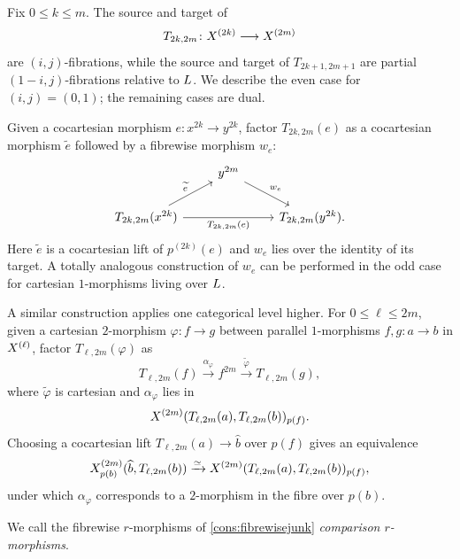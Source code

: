 \documentclass[a4paper,reqno,twoside]{amsart}
\begin{document}
\begin{construction}\label{cons:fibrewisejunk}
	Fix $0\leq k\leq m$. The source and target of
	\[
		T_{2k,2m}\colon\relax{X}^{(2k)}\longrightarrow\relax{X}^{(2m)}
	\]
	are $(i,j)$-fibrations, while the source and target of $T_{2k+1,2m+1}$ are partial $(1-i,j)$-fibrations relative to $\relax{L}$. We describe the even case for $(i,j)=(0,1)$; the remaining cases are dual.

	Given a cocartesian morphism $e\colon x^{2k}\to y^{2k}$, factor $T_{2k,2m}(e)$ as a cocartesian morphism $\widetilde e$ followed by a fibrewise morphism $w_e$:
	\[
	\begin{tikzcd}
		& y^{2m} \arrow[dr,"w_e"] & \\
		T_{2k,2m}(x^{2k}) \arrow[ur,"\widetilde e"]
			\arrow[rr,"T_{2k,2m}(e)"']
		&& T_{2k,2m}(y^{2k}).
	\end{tikzcd}
	\]
	Here $\widetilde e$ is a cocartesian lift of $p^{(2k)}(e)$ and $w_e$ lies over the identity of its target. A totally analogous construction of $w_e$ can be performed in the odd case for cartesian $1$-morphisms living over $\relax{L}$.

	A similar construction applies one categorical level higher. For $0\leq\ell\leq2m$, given a cartesian $2$-morphism $\varphi\colon f\to g$ between parallel $1$-morphisms $f,g\colon a\to b$ in $\relax{X}^{(\ell)}$, factor $T_{\ell,2m}(\varphi)$ as
	\[
		T_{\ell,2m}(f)
		\xrightarrow{\alpha_\varphi} f^{2m}
		\xrightarrow{\widetilde\varphi} T_{\ell,2m}(g),
	\]
	where $\widetilde\varphi$ is cartesian and $\alpha_\varphi$ lies in
	\[
		\relax{X}^{(2m)}(T_{\ell,2m}(a),T_{\ell,2m}(b))_{p(f)}.
	\]
	Choosing a cocartesian lift $T_{\ell,2m}(a)\to\widehat b$ over $p(f)$ gives an equivalence
	\[
		\relax{X}^{(2m)}_{p(b)}(\widehat b,T_{\ell,2m}(b))
		\xrightarrow{\simeq}
		\relax{X}^{(2m)}(T_{\ell,2m}(a),T_{\ell,2m}(b))_{p(f)},
	\]
	under which $\alpha_\varphi$ corresponds to a $2$-morphism in the fibre over $p(b)$. 
	
	
\end{construction}

\begin{definition}\label{def:comparison}
	We call the fibrewise $r$-morphisms of \cref{cons:fibrewisejunk} \emph{comparison $r$-morphisms}.
\end{definition}
\end{document}
